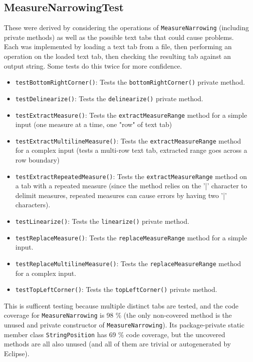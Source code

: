 \documentclass[11pt]{article}
\begin{document}
\subsection{MeasureNarrowingTest}
\label{sec:org3840881}
These were derived by considering the operations of \texttt{MeasureNarrowing} (including private methods) as well as the possible text tabs that could cause problems.\\
Each was implemented by loading a text tab from a file, then performing an operation on the loaded text tab, then checking the resulting tab against an output string.  Some tests do this twice for more confidence.\\
\begin{itemize}
\item \texttt{testBottomRightCorner()}: Tests the \texttt{bottomRightCorner()} private method.\\
\item \texttt{testDelinearize()}: Tests the \texttt{delinearize()} private method.\\
\item \texttt{testExtractMeasure()}: Tests the \texttt{extractMeasureRange} method for a simple input (one measure at a time, one "row" of text tab)\\
\item \texttt{testExtractMultilineMeasure()}: Tests the \texttt{extractMeasureRange} method for a complex input (tests a multi-row text tab, extracted range goes across a row boundary)\\
\item \texttt{testExtractRepeatedMeasure()}: Tests the \texttt{extractMeasureRange} method on a tab with a repeated measure (since the method relies on the '|' character to delimit measures, repeated measures can cause errors by having two '|' characters).\\
\item \texttt{testLinearize()}: Tests the \texttt{linearize()} private method.\\
\item \texttt{testReplaceMeasure()}: Tests the \texttt{replaceMeasureRange} method for a simple input.\\
\item \texttt{testReplaceMultilineMeasure()}: Tests the \texttt{replaceMeasureRange} method for a complex input.\\
\item \texttt{testTopLeftCorner()}: Tests the \texttt{topLeftCorner()} private method.\\
\end{itemize}

This is sufficent testing because multiple distinct tabs are tested, and the code coverage for \texttt{MeasureNarrowing} is 98 \% (the only non-covered method is the unused and private constructor of \texttt{MeasureNarrowing}).  Its package-private static member class \texttt{StringPosition} has 69 \% code coverage, but the uncovered methods are all also unused (and all of them are trivial or autogenerated by Eclipse).\\
\end{document}
